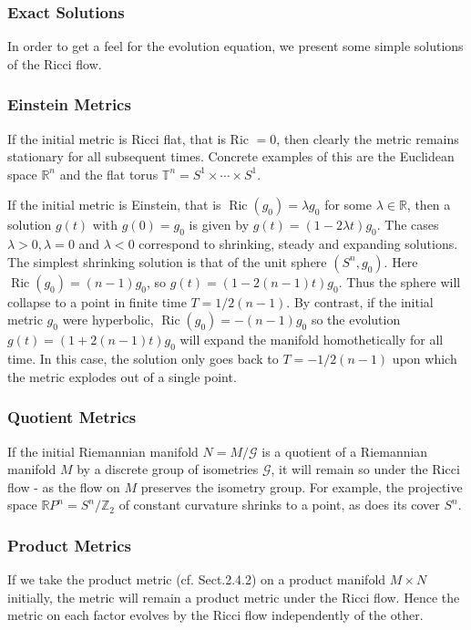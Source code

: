 \documentclass[10pt, letterpaper]{article}
\begin{document}
\subsubsection*{Exact Solutions}
In order to get a feel for the evolution equation, we present some simple solutions of the Ricci flow.

\subsubsection*{Einstein Metrics}
If the initial metric is Ricci flat, that is Ric $=0$, then clearly the metric remains stationary for all subsequent times. Concrete examples of this are the Euclidean space $\mathbb{R}^{n}$ and the flat torus $\mathbb{T}^{n}=S^{1} \times \cdots \times S^{1}$.

If the initial metric is Einstein, that is $\operatorname{Ric}\left(g_{0}\right)=\lambda g_{0}$ for some $\lambda \in \mathbb{R}$, then a solution $g(t)$ with $g(0)=g_{0}$ is given by $g(t)=(1-2 \lambda t) g_{0}$. The cases $\lambda>0, \lambda=0$ and $\lambda<0$ correspond to shrinking, steady and expanding solutions. The simplest shrinking solution is that of the unit sphere $\left(S^{n}, g_{0}\right)$. Here $\operatorname{Ric}\left(g_{0}\right)=(n-1) g_{0}$, so $g(t)=(1-2(n-1) t) g_{0}$. Thus the sphere will collapse to a point in finite time $T=1 / 2(n-1)$. By contrast, if the initial metric $g_{0}$ were hyperbolic, $\operatorname{Ric}\left(g_{0}\right)=-(n-1) g_{0}$ so the evolution $g(t)=(1+2(n-1) t) g_{0}$ will expand the manifold homothetically for all time. In this case, the solution only goes back to $T=-1 / 2(n-1)$ upon which the metric explodes out of a single point.

\subsubsection*{Quotient Metrics}
If the initial Riemannian manifold $N=M / \mathcal{G}$ is a quotient of a Riemannian manifold $M$ by a discrete group of isometries $\mathcal{G}$, it will remain so under the Ricci flow - as the flow on $M$ preserves the isometry group. For example, the projective space $\mathbb{R} P^{n}=S^{n} / \mathbb{Z}_{2}$ of constant curvature shrinks to a point, as does its cover $S^{n}$.

\subsubsection*{Product Metrics}
If we take the product metric (cf. Sect.2.4.2) on a product manifold $M \times N$ initially, the metric will remain a product metric under the Ricci flow. Hence the metric on each factor evolves by the Ricci flow independently of the other.
\end{document}
